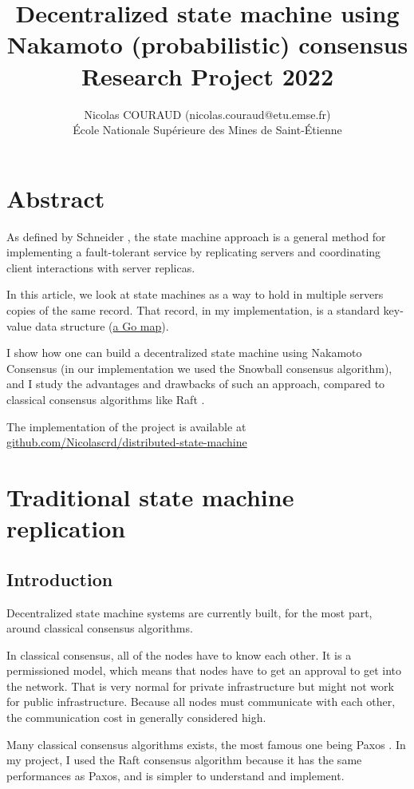 \documentclass[11pt, twocolumn]{article}
\title{Decentralized state machine using Nakamoto (probabilistic) consensus\\\medskip Research Project 2022}
\author{Nicolas COURAUD (nicolas.couraud@etu.emse.fr)\\École Nationale Supérieure des Mines de Saint-Étienne}
\begin{document}
\maketitle
\onecolumn
\section*{Abstract}

As defined by Schneider \cite{stateMachine}, the state machine approach is a general method for implementing a fault-tolerant service
by replicating servers and coordinating client interactions with server replicas.

In this article, we look at state machines as a way to hold in multiple servers copies of the same record. That record, in my implementation, is a standard
key-value data structure (\href{https://go.dev/blog/maps}{a Go map}).

I show how one can build a decentralized state machine using Nakamoto Consensus (in our implementation we used the Snowball consensus algorithm), and I study the advantages
and drawbacks of such an approach, compared to classical consensus algorithms like Raft \cite{understandable}.

The implementation of the project is available at \href{https://github.com/Nicolascrd/distributed-state-machine}{github.com/Nicolascrd/distributed-state-machine}


\tableofcontents

\section{Traditional state machine replication}

\subsection{Introduction}

Decentralized state machine systems are currently built, for the most part, around classical consensus algorithms.

In classical consensus, all of the nodes have to know each other. It is a permissioned model, which means that nodes have to get an approval to get into the network.
That is very normal for private infrastructure but might not work for public infrastructure. Because all nodes must communicate with each other, the communication cost in generally considered high.

Many classical consensus algorithms exists, the most famous one being Paxos \cite{parliament}. In my project, I used the Raft consensus algorithm \cite{understandable} because it has the same performances
as Paxos, and is simpler to understand and implement.
\end{document}
